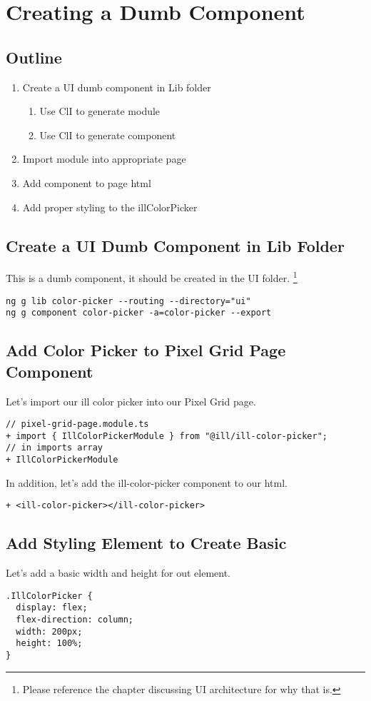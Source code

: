 
\section{ Creating a Dumb Component }

\subsection {Outline}

\begin{enumerate}
  \item Create a UI dumb component in Lib folder
    \begin{enumerate}
      \item Use ClI to generate module
      \item Use ClI to generate component
    \end{enumerate}
  \item Import module into appropriate page
  \item Add component to page html
  \item Add proper styling to the illColorPicker
\end{enumerate}

\subsection {Create a UI Dumb Component in Lib Folder}
This is a dumb component, it should be created in the UI folder.
\footnote{Please reference the chapter discussing UI architecture for why
that is.}

\begin{lstlisting}
ng g lib color-picker --routing --directory="ui"
ng g component color-picker -a=color-picker --export
\end{lstlisting}

\subsection{ Add Color Picker to Pixel Grid Page Component }
Let's import our ill color picker into our Pixel Grid page.

\begin{lstlisting}
// pixel-grid-page.module.ts
+ import { IllColorPickerModule } from "@ill/ill-color-picker";
// in imports array
+ IllColorPickerModule
\end{lstlisting}

In addition, let's add the ill-color-picker component to our html.
\begin{lstlisting}
+ <ill-color-picker></ill-color-picker>
\end{lstlisting}

\subsection{ Add Styling Element to Create Basic  }
Let's add a basic width and height for out element.
\begin{lstlisting}
.IllColorPicker {
  display: flex;
  flex-direction: column;
  width: 200px;
  height: 100%;
}
\end{lstlisting}
